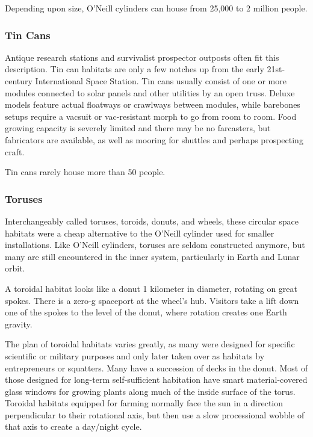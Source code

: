 Depending upon size, O'Neill cylinders can house 
from 25,000 to 2 million people.

\subsubsection{Tin Cans}

Antique research stations and survivalist prospector 
outposts often fit this description. Tin can habitats 
are only a few notches up from the early 21st-century 
International Space Station. Tin cans usually consist 
of one or more modules connected to solar panels 
and other utilities by an open truss. Deluxe models 
feature actual floatways or crawlways between 
modules, while barebones setups require a vacsuit or 
vac-resistant morph to go from room to room. Food 
growing capacity is severely limited and there may be 
no farcasters, but fabricators are available, as well as 
mooring for shuttles and perhaps prospecting craft.

Tin cans rarely house more than 50 people.

\subsubsection{Toruses}

Interchangeably called toruses, toroids, donuts, and 
wheels, these circular space habitats were a cheap 
alternative to the O'Neill cylinder used for smaller 
installations. Like O'Neill cylinders, toruses are seldom 
constructed anymore, but many are still encountered in 
the inner system, particularly in Earth and Lunar orbit.

A toroidal habitat looks like a donut 1 kilometer in 
diameter, rotating on great spokes. There is a zero-g 
spaceport at the wheel's hub. Visitors take a lift down 
one of the spokes to the level of the donut, where 
rotation creates one Earth gravity.

The plan of toroidal habitats varies greatly, as many 
were designed for specific scientific or military purposes 
and only later taken over as habitats by entrepreneurs 
or squatters. Many have a succession of decks in the 
donut. Most of those designed for long-term self-sufficient
habitation have smart material-covered glass
windows for growing plants along much of the inside 
surface of the torus. Toroidal habitats equipped for 
farming normally face the sun in a direction perpendicular
to their rotational axis, but then use a slow processional
wobble of that axis to create a day/night cycle.

